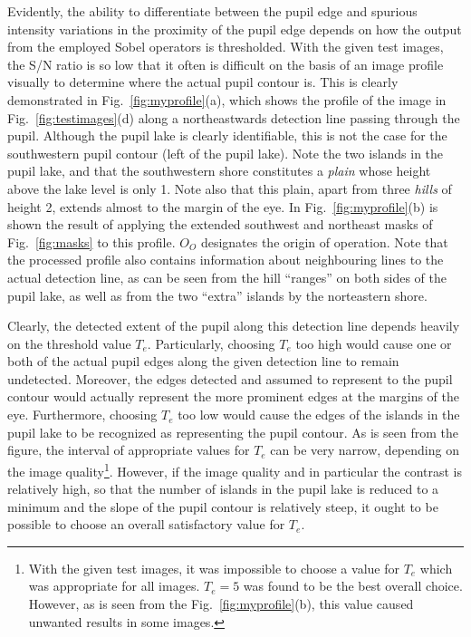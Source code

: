 Evidently, the ability to differentiate between the pupil edge and
spurious intensity variations in the proximity of the pupil edge
depends on how the output from the employed Sobel operators is
thresholded.  With the given test images, the S/N ratio is so low that
it often is difficult on the basis of an image profile visually to
determine where the actual pupil contour is.  This is clearly
demonstrated in Fig.~\ref{fig:myprofile}(a), which shows the profile
of the image in Fig.~\ref{fig:testimages}(d) along a northeastwards
detection line passing through the pupil.  Although the pupil lake is
clearly identifiable, this is not the case for the southwestern pupil
contour (left of the pupil lake).  Note the two islands in the pupil
lake, and that the southwestern shore constitutes a {\em plain\/}
whose height above the lake level is only 1.  Note also that this
plain, apart from three {\em hills\/} of height 2, extends almost to
the margin of the eye.  In Fig.~\ref{fig:myprofile}(b) is shown the
result of applying the extended southwest and northeast masks of
Fig.~\ref{fig:masks} to this profile.  $O_{O}$ designates the origin
of operation.  Note that the processed profile also contains
information about neighbouring lines to the actual detection line, as
can be seen from the hill ``ranges'' on both sides of the pupil lake,
as well as from the two ``extra'' islands by the norteastern shore.

Clearly, the detected extent of the pupil along this detection line
depends heavily on the threshold value $T_{e}$.  Particularly,
choosing $T_{e}$ too high would cause one or both of the actual pupil
edges along the given detection line to remain undetected.  Moreover,
the edges detected and assumed to represent to the pupil contour would
actually represent the more prominent edges at the margins of the eye.
Furthermore, choosing $T_{e}$ too low would cause the edges of the
islands in the pupil lake to be recognized as representing the pupil
contour.  As is seen from the figure, the interval of appropriate
values for $T_{e}$ can be very narrow, depending on the image
quality\footnote{\label{pg:TEproblems}With the given test images, it
  was impossible to choose a value for $T_{e}$ which was appropriate
  for all images.  $T_{e}=5$ was found to be the best overall choice.
  However, as is seen from the Fig.~\ref{fig:myprofile}(b), this value
  caused unwanted results in some images.}.  However, if the image
quality and in particular the contrast is relatively high, so that the
number of islands in the pupil lake is reduced to a minimum and the
slope of the pupil contour is relatively steep, it ought to be
possible to choose an overall satisfactory value for $T_{e}$.

